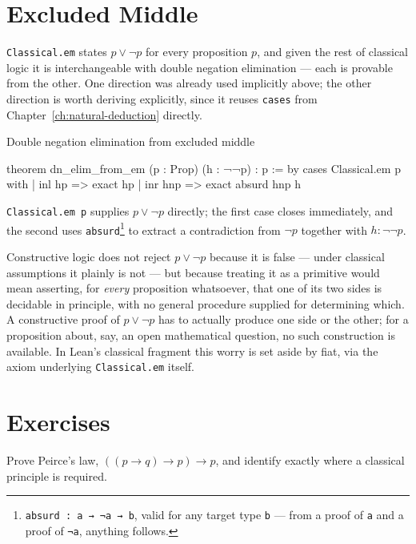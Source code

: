 \section{Excluded Middle}

\texttt{Classical.em} states $p \lor \lnot p$ for every proposition
$p$, and given the rest of classical logic it is interchangeable
with double negation elimination — each is provable from the other.
One direction was already used implicitly above; the other direction
is worth deriving explicitly, since it reuses \texttt{cases} from
Chapter~\ref{ch:natural-deduction} directly.

\begin{experiment}{Double negation elimination from excluded middle}
\begin{lean}
theorem dn_elim_from_em (p : Prop) (h : ¬¬p) : p := by
  cases Classical.em p with
  | inl hp => exact hp
  | inr hnp => exact absurd hnp h
\end{lean}
\texttt{Classical.em p} supplies $p \lor \lnot p$ directly; the
first case closes immediately, and the second uses
\texttt{absurd}\footnote{\texttt{absurd : a → ¬a → b}, valid for any
target type \texttt{b} — from a proof of \texttt{a} and a proof of
\texttt{¬a}, anything follows.} to extract a contradiction from
$\lnot p$ together with $h : \lnot\lnot p$.
\end{experiment}

Constructive logic does not reject $p \lor \lnot p$ because it is
false — under classical assumptions it plainly is not — but because
treating it as a primitive would mean asserting, for
\emph{every} proposition whatsoever, that one of its two sides is
decidable in principle, with no general procedure supplied for
determining which. A constructive proof of $p \lor \lnot p$ has to
actually produce one side or the other; for a proposition about, say,
an open mathematical question, no such construction is available. In
Lean's classical fragment this worry is set aside by fiat, via the
axiom underlying \texttt{Classical.em} itself.

\section{Exercises}

\begin{exercise}
Prove Peirce's law, $((p \to q) \to p) \to p$, and identify exactly
where a classical principle is required.
\end{exercise}
